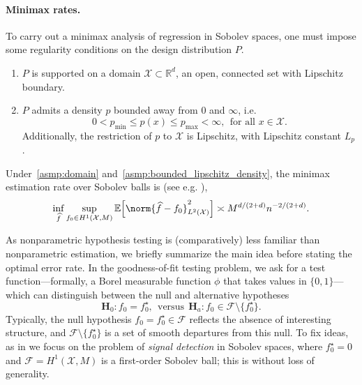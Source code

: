 \documentclass[twoside]{article}
\newcommand{\Reals}{\mathbb{R}}
\newcommand{\1}{\mathbf{1}}
\newcommand{\Rd}{\Reals^d}
\newcommand{\Xset}{\mathcal{X}}
\newcommand{\mc}[1]{\mathcal{#1}}
\newcommand{\Ebb}{\mathbb{E}}
\newcommand{\wh}[1]{\widehat{#1}}
\theoremstyle{definition}
\theoremstyle{remark}
\begin{document}
\paragraph{Minimax rates.}
To carry out a minimax analysis of regression in Sobolev spaces, one must impose some regularity conditions on the design distribution $P$. 
\begin{enumerate}[label=(P\arabic*)]
	\item
	\label{asmp:domain}
	$P$ is supported on a domain $\Xset \subset \Rd$, an open, connected set with Lipschitz boundary.
	\item
	\label{asmp:bounded_lipschitz_density} 
	$P$ admits a density $p$ bounded away from $0$ and $\infty$, i.e.
	\begin{equation*}
	0 < p_{\min} \leq p(x) \leq p_{\max} < \infty,~~\textrm{for all $x \in \Xset$.}
	\end{equation*}
	Additionally, the restriction of $p$ to $\Xset$ is Lipschitz, with Lipschitz constant $L_p$.
\end{enumerate}

Under~\ref{asmp:domain} and~\ref{asmp:bounded_lipschitz_density}, the minimax estimation rate over Sobolev balls is (see e.g. \citep{tsybakov2008_book}),
\begin{equation}
\label{eqn:sobolev_space_estimation_minimax_rate}
\inf_{\wh{f}} \sup_{f_0 \in H^1(\Xset, M)} \Ebb\Bigl[\norm{\wh{f} - f_0}_{L^2(\Xset)}^2\Bigr] \asymp M^{d/(2 + d)}n^{-2/(2 + d)}.
\end{equation}

As nonparametric hypothesis testing is (comparatively) less familiar than nonparametric estimation, we briefly summarize the main idea before stating the optimal error rate. In the goodness-of-fit testing problem, we ask for a test function---formally, a Borel measurable function $\phi$ that takes values in $\{0,1\}$--- which can distinguish between the null and alternative hypotheses
\begin{equation}
\mathbf{H}_0: f_0 = f_0^{\star}, ~~\textrm{versus}~~ \mathbf{H}_a: f_0 \in \mc{F} \setminus \{f_0^{\star}\}.
\end{equation} 
Typically, the null hypothesis $f_0 = f_0^{\star} \in \mc{F}$ reflects the absence of interesting structure, and $\mc{F} \setminus  \{f_0^{\star}\}$ is a set of smooth departures from this null. To fix ideas, as in \cite{ingster2009} we focus on the problem of \emph{signal detection} in Sobolev spaces, where $f_0^{\star} = 0$ and $\mc{F} = H^1(\Xset,M)$ is a first-order Sobolev ball; this is without loss of generality.
\end{document}
